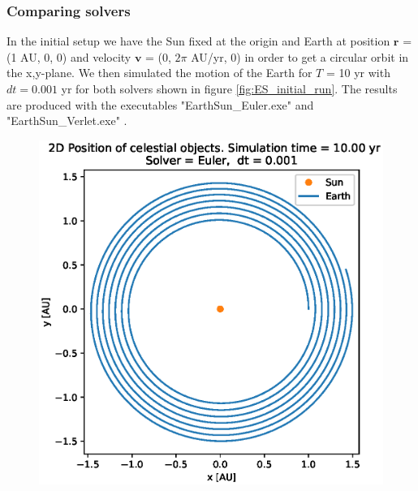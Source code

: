 \documentclass[american,a4paper,12pt]{article}
\renewcommand{\vec}[1]{\mathbf{#1}} %
\begin{document}
\subsubsection{Comparing solvers}
In the initial setup we have the Sun fixed at the origin and Earth at position $\vec{r}$ = (1 AU, 0, 0) and velocity $\vec{v}$ = (0, $2\pi$ AU/yr, 0) in order to get a circular orbit in the x,y-plane. We then simulated the motion of the Earth for $T$ = 10 yr with $dt = 0.001$ yr for both solvers shown in figure \ref{fig:ES_initial_run}. The results are produced with the executables "EarthSun\_Euler.exe" and "EarthSun\_Verlet.exe" \cite{testfiles}.
\begin{figure}[H]
  \centering
  \begin{minipage}[b]{0.49\textwidth}
    \includegraphics[width=\textwidth]{figures/Earth_Sun_10yr_Stable_Euler.eps}
  \end{minipage}
  \hfill
  \begin{minipage}[b]{0.49\textwidth}

\end{minipage}
\end{figure}
\end{document}
